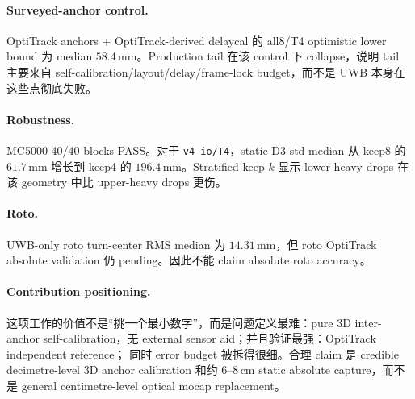 \documentclass[11pt,a4paper]{article}
\newcommand{\mm}{\,\si{\milli\meter}}
\begin{document}
\paragraph{Surveyed-anchor control.}
OptiTrack anchors + OptiTrack-derived delaycal 的 all8/T4 optimistic lower bound 为
median $58.4\mm$。Production tail 在该 control 下 collapse，说明 tail 主要来自
self-calibration/layout/delay/frame-lock budget，而不是 UWB 本身在这些点彻底失败。

\paragraph{Robustness.}
MC5000 40/40 blocks PASS。对于 \texttt{v4-io/T4}，static D3 std median 从 keep8 的
$61.7\mm$ 增长到 keep4 的 $196.4\mm$。Stratified keep-$k$ 显示 lower-heavy drops 在该
geometry 中比 upper-heavy drops 更伤。

\paragraph{Roto.}
UWB-only roto turn-center RMS median 为 $14.31\mm$，但 roto OptiTrack absolute validation
仍 pending。因此不能 claim absolute roto accuracy。

\paragraph{Contribution positioning.}
这项工作的价值不是“挑一个最小数字”，而是问题定义最难：pure 3D inter-anchor
self-calibration，无 external sensor aid；并且验证最强：OptiTrack independent reference；
同时 error budget 被拆得很细。合理 claim 是 credible decimetre-level 3D anchor calibration
和约 $6$--$8\,\si{\centi\meter}$ static absolute capture，而不是 general centimetre-level
optical mocap replacement。
\end{document}
